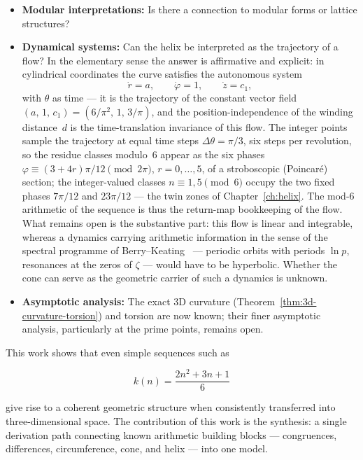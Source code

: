 \begin{itemize}
\item \textbf{Modular interpretations:}
  Is there a connection to modular forms or lattice structures?

\item \textbf{Dynamical systems:}
  Can the helix be interpreted as the trajectory of a flow? In the
  elementary sense the answer is affirmative and explicit: in
  cylindrical coordinates the curve satisfies the autonomous system
  \[
    \dot r = a, \qquad \dot\varphi = 1, \qquad \dot z = c_1,
  \]
  with $\theta$ as time --- it is the trajectory of the constant
  vector field $(a,\, 1,\, c_1) = (6/\pi^2,\, 1,\, 3/\pi)$, and the
  position-independence of the winding distance~$d$ is the
  time-translation invariance of this flow. The integer points sample
  the trajectory at equal time steps $\Delta\theta = \pi/3$, six steps
  per revolution, so the residue classes modulo~$6$ appear as the six
  phases $\varphi \equiv (3+4r)\pi/12 \pmod{2\pi}$, $r = 0,\ldots,5$,
  of a stroboscopic (Poincar\'e) section; the integer-valued classes
  $n \equiv 1, 5 \pmod 6$ occupy the two fixed phases $7\pi/12$ and
  $23\pi/12$ --- the twin zones of Chapter~\ref{ch:helix}. The mod-$6$
  arithmetic of the sequence is thus the return-map bookkeeping of the
  flow. What remains open is the substantive part: this flow is linear
  and integrable, whereas a dynamics carrying arithmetic information
  in the sense of the spectral programme of
  Berry--Keating~\cite{BerryKeating1999} --- periodic orbits with
  periods $\ln p$, resonances at the zeros of $\zeta$ --- would have
  to be hyperbolic. Whether the cone can serve as the geometric
  carrier of such a dynamics is unknown.

\item \textbf{Asymptotic analysis:}
  The exact 3D curvature (Theorem~\ref{thm:3d-curvature-torsion}) and torsion
  are now known; their finer asymptotic analysis, particularly at
  the prime points, remains open.
\end{itemize}

This work shows that even simple sequences such as


\[
k(n) = \frac{2n^2 + 3n + 1}{6}
\]


give rise to a coherent geometric structure when consistently
transferred into three-dimensional space. The contribution of this work
is the synthesis: a single derivation path connecting known arithmetic
building blocks --- congruences, differences, circumference, cone, and
helix --- into one model.
